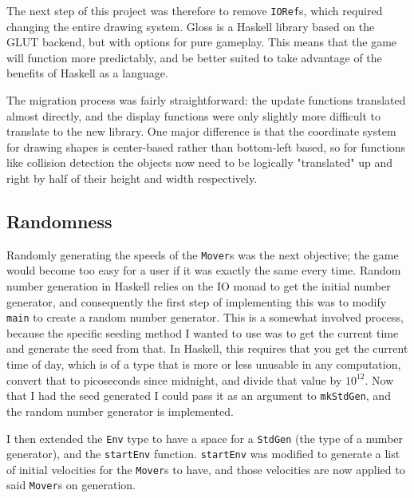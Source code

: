 \documentclass[12pt, a4paper]{report}
\begin{document}
\par

The next step of this project was therefore to remove \verb|IORef|s, which required changing the entire drawing system.
Gloss is a Haskell library based on the GLUT backend, but with options for pure gameplay.
This means that the game will function more predictably, and be better suited to take advantage of the benefits of Haskell as a language.

\par

The migration process was fairly straightforward: the update functions translated almost directly, and the display functions were only slightly more difficult to translate to the new library.
One major difference is that the coordinate system for drawing shapes is center-based rather than bottom-left based, so for functions like collision detection the objects now need to be logically "translated" up and right by half of their height and width respectively.

\subsection{Randomness}

Randomly generating the speeds of the \verb|Mover|s was the next objective; the game would become too easy for a user if it was exactly the same every time.
Random number generation in Haskell relies on the IO monad to get the initial number generator, and consequently the first step of implementing this was to modify \verb|main| to create a random number generator.
This is a somewhat involved process, because the specific seeding method I wanted to use was to get the current time and generate the seed from that.
In Haskell, this requires that you get the current time of day, which is of a type that is more or less unusable in any computation, convert that to picoseconds since midnight, and divide that value by $10^{12}$.
Now that I had the seed generated I could pass it as an argument to \verb|mkStdGen|, and the random number generator is implemented.

\par

I then extended the \verb|Env| type to have a space for a \verb|StdGen| (the type of a number generator), and the \verb|startEnv| function.
\verb|startEnv| was modified to generate a list of initial velocities for the \verb|Mover|s to have, and those velocities are now applied to said \verb|Mover|s on generation.
\end{document}
